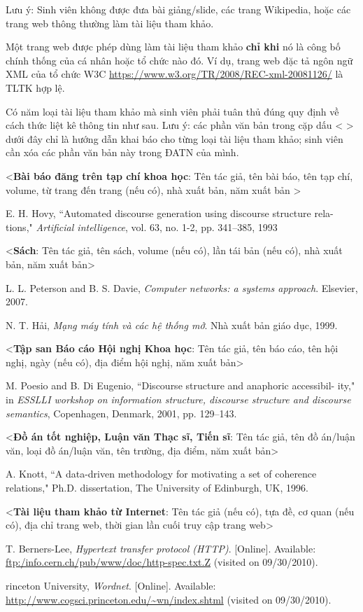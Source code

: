 \documentclass[../Main.tex]{subfiles}
\begin{document}
Lưu ý: Sinh viên không được đưa bài giảng/slide, các trang Wikipedia, hoặc các trang web thông thường làm tài liệu tham khảo. 

Một trang web được phép dùng làm tài liệu tham khảo \textbf{chỉ khi} nó là công bố chính thống của cá nhân hoặc tổ chức nào đó. Ví dụ, trang web đặc tả ngôn ngữ XML của tổ chức W3C \url{https://www.w3.org/TR/2008/REC-xml-20081126/} là TLTK hợp lệ.

Có năm loại tài liệu tham khảo mà sinh viên phải tuân thủ đúng quy định về cách thức liệt kê thông tin như sau. Lưu ý: các phần văn bản trong cặp dấu < > dưới đây chỉ là hướng dẫn khai báo cho từng loại tài liệu tham khảo; sinh viên cần xóa các phần văn bản này trong ĐATN của mình.

<\textbf{Bài báo đăng trên tạp chí khoa học}: Tên tác giả, tên bài báo, tên tạp chí, volume, từ trang đến trang (nếu có), nhà xuất bản, năm xuất bản >



\cite{hovy1993automated} E. H. Hovy, ``Automated discourse generation using discourse structure rela-
tions," \textit{Artificial intelligence}, vol. 63, no. 1-2, pp. 341–385, 1993

<\textbf{Sách}: Tên tác giả, tên sách, volume (nếu có), lần tái bản (nếu có), nhà xuất bản, năm xuất bản>

\cite{peterson2007computer}	L. L. Peterson and B. S. Davie, \textit{Computer networks: a systems approach}. Elsevier, 2007.

\cite{NguyenThucHai}	N. T. Hải, \textit{Mạng máy tính và các hệ thống mở}. Nhà xuất bản giáo dục, 1999. 

<\textbf{Tập san Báo cáo Hội nghị Khoa học}: Tên tác giả, tên báo cáo, tên hội nghị, ngày (nếu có), địa điểm hội nghị, năm xuất bản>

\cite{poesio2001discourse}	M. Poesio and B. Di Eugenio, ``Discourse structure and anaphoric accessibil-
ity," in \textit{ESSLLI workshop on information structure, discourse structure and
discourse semantics}, Copenhagen, Denmark, 2001, pp. 129–143.

<\textbf{Đồ án tốt nghiệp, Luận văn Thạc sĩ, Tiến sĩ}: Tên tác giả, tên đồ án/luận văn, loại đồ án/luận văn, tên trường, địa điểm, năm xuất bản>

\cite{knott1996data}	A. Knott, ``A data-driven methodology for motivating a set of coherence relations," Ph.D. dissertation, The University of Edinburgh, UK, 1996.

<\textbf{Tài liệu tham khảo từ Internet}: Tên tác giả (nếu có), tựa đề, cơ quan (nếu có), địa chỉ trang web, thời gian lần cuối truy cập trang web>

\cite{BernersTim}	T. Berners-Lee, \textit{Hypertext transfer protocol (HTTP)}. [Online]. Available: \url{ftp:/info.cern.ch/pub/www/doc/http-spec.txt.Z} (visited on
09/30/2010).

\cite{LectureA} rinceton University, \textit{Wordnet}. [Online]. Available: \url{http://www.cogsci.princeton.edu/~wn/index.shtml} (visited on 09/30/2010).
\end{document}
